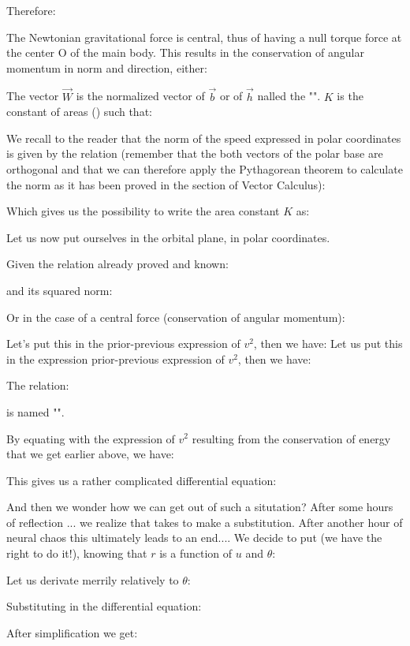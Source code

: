 	Therefore:
	
	The Newtonian gravitational force is central, thus of having a null torque force at the center O of the main body. This results in the conservation of angular momentum in norm and direction, either:
	
	The vector $\vec{W}$ is the normalized vector of $\vec{b}$ or of $\vec{h}$ nalled the "". $K$ is the constant of areas () such that:
	
	We recall to the reader that the norm of the speed expressed in polar coordinates is given by the relation (remember that the both vectors of the polar base are orthogonal and that we can therefore apply the Pythagorean theorem to calculate the norm as it has been proved in the section of Vector Calculus):
	
	Which gives us the possibility to write the area constant $K$ as:
	
	Let us now put ourselves in the orbital plane, in polar coordinates.
	
	Given the relation already proved and known:
	
	and its squared norm:
	
	Or in the case of a central force (conservation of angular momentum):
	
	Let's put this in the prior-previous expression of $v^2$, then we have:
	Let us put this in the expression prior-previous expression of $v^2$, then we have:
	
	The relation:
	
	is named "".
	
	By equating with the expression of $v^2$ resulting from the conservation of energy that we get earlier above, we have:
	
	This gives us a rather complicated differential equation:
	
	And then we wonder how we can get out of such a situtation? After some hours of reflection ... we realize that takes to make a substitution. After another hour of neural chaos this ultimately leads to an end.... We decide to put (we have the right to do it!), knowing that $r$ is a function of $u$ and $\theta$:
	
	Let us derivate merrily relatively to $\theta$:
	
	Substituting in the differential equation:
	
	After simplification we get:
	
